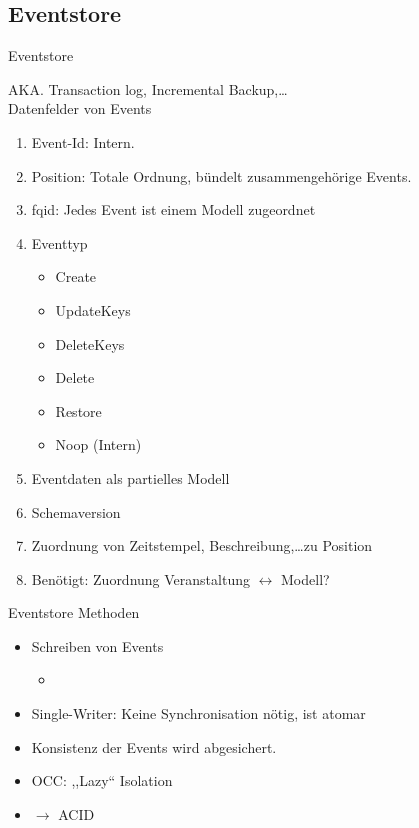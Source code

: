 \documentclass[10pt]{beamer}
\begin{document}
\subsection{Eventstore}
\begin{frame}{Eventstore}

	{\color{gray}AKA. Transaction log, Incremental Backup,\ldots}\\[5mm]
	Datenfelder von Events
	\begin{enumerate}
		\item Event-Id: Intern.
		\item Position: Totale Ordnung, bündelt zusammengehörige Events.
		\item fqid: Jedes Event ist einem Modell zugeordnet
		\item Eventtyp
		\begin{itemize}
			\item Create
			\item UpdateKeys
			\item DeleteKeys
			\item Delete
			\item Restore
			\item Noop (Intern)
		\end{itemize}
		\item Eventdaten als partielles Modell
		\item Schemaversion
		\item Zuordnung von Zeitstempel, Beschreibung,\ldots zu Position
		\item Benötigt: Zuordnung Veranstaltung $\leftrightarrow$ Modell?
	\end{enumerate}
\end{frame}
\begin{frame}{Eventstore}
	Methoden
	\begin{itemize}
		\item Schreiben von Events
		\begin{itemize}
			\item 
		\end{itemize}
		\item Single-Writer: Keine Synchronisation nötig, ist atomar
		\item Konsistenz der Events wird abgesichert.
		\item OCC: ,,Lazy`` Isolation
		\item $\rightarrow$ ACID
	\end{itemize}
\end{frame}
\end{document}
